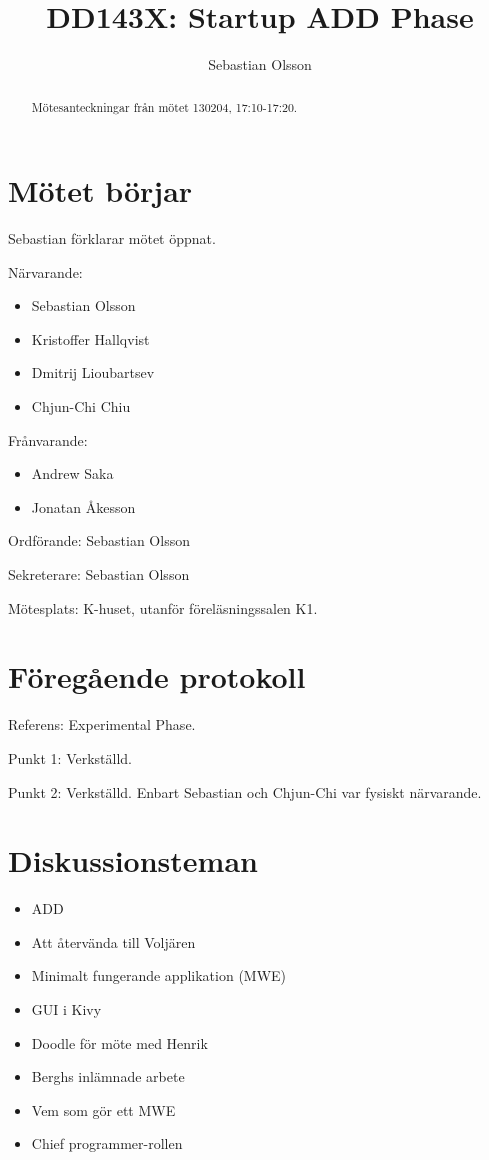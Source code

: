 \documentclass[a4paper,12pt]{article}
\author{Sebastian Olsson}
\title{DD143X: Startup ADD Phase}
\begin{document}
\maketitle
\begin{abstract}
    Mötesanteckningar från mötet 130204, 17:10-17:20.
\end{abstract}

\section{Mötet börjar}
Sebastian förklarar mötet öppnat.

Närvarande:
\begin{itemize}
\item Sebastian Olsson
\item Kristoffer Hallqvist
\item Dmitrij Lioubartsev
\item Chjun-Chi Chiu
\end{itemize}
Frånvarande:
\begin{itemize}
\item Andrew Saka
\item Jonatan Åkesson
\end{itemize}

Ordförande: Sebastian Olsson

Sekreterare: Sebastian Olsson

Mötesplats: K-huset, utanför föreläsningssalen K1.

\section{Föregående protokoll}
Referens: Experimental Phase.

Punkt 1: Verkställd.

Punkt 2: Verkställd. Enbart Sebastian och Chjun-Chi var fysiskt närvarande.

\section{Diskussionsteman}
\begin{itemize}
\item ADD
\item Att återvända till Voljären
\item Minimalt fungerande applikation (MWE)
\item GUI i Kivy
\item Doodle för möte med Henrik
\item Berghs inlämnade arbete
\item Vem som gör ett MWE
\item Chief programmer-rollen
\end{itemize}
\end{document}
